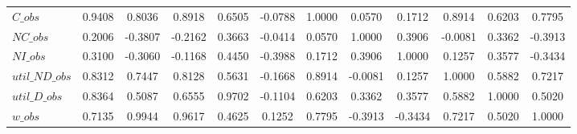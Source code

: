 \begin{center}
\begin{longtable}{lccccccccccc}
$C\_obs         $	 & 	           0.9408	 & 	           0.8036	 & 	           0.8918	 & 	           0.6505	 & 	          -0.0788	 & 	           1.0000	 & 	           0.0570	 & 	           0.1712	 & 	           0.8914	 & 	           0.6203	 & 	           0.7795 \\ 
$NC\_obs        $	 & 	           0.2006	 & 	          -0.3807	 & 	          -0.2162	 & 	           0.3663	 & 	          -0.0414	 & 	           0.0570	 & 	           1.0000	 & 	           0.3906	 & 	          -0.0081	 & 	           0.3362	 & 	          -0.3913 \\ 
$NI\_obs        $	 & 	           0.3100	 & 	          -0.3060	 & 	          -0.1168	 & 	           0.4450	 & 	          -0.3988	 & 	           0.1712	 & 	           0.3906	 & 	           1.0000	 & 	           0.1257	 & 	           0.3577	 & 	          -0.3434 \\ 
$util\_ND\_obs  $	 & 	           0.8312	 & 	           0.7447	 & 	           0.8128	 & 	           0.5631	 & 	          -0.1668	 & 	           0.8914	 & 	          -0.0081	 & 	           0.1257	 & 	           1.0000	 & 	           0.5882	 & 	           0.7217 \\ 
$util\_D\_obs   $	 & 	           0.8364	 & 	           0.5087	 & 	           0.6555	 & 	           0.9702	 & 	          -0.1104	 & 	           0.6203	 & 	           0.3362	 & 	           0.3577	 & 	           0.5882	 & 	           1.0000	 & 	           0.5020 \\ 
$w\_obs         $	 & 	           0.7135	 & 	           0.9944	 & 	           0.9617	 & 	           0.4625	 & 	           0.1252	 & 	           0.7795	 & 	          -0.3913	 & 	          -0.3434	 & 	           0.7217	 & 	           0.5020	 & 	           1.0000 \\ 
\end{longtable}
 \end{center}
